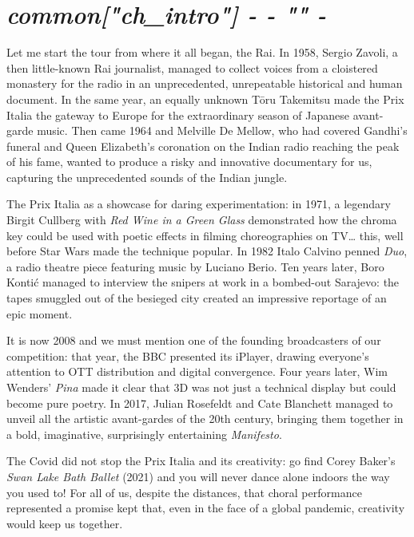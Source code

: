 {%
{%
\chapter*{\hfill{\slshape {{ common["ch_intro"] -}} {{- "}}" -}}
\thispagestyle{empty}
\vspace{70pt}
Let me start the tour from where it all began, the Rai. In 1958, Sergio Zavoli, a then little-known Rai journalist, managed to collect voices from a cloistered monastery for the radio in an unprecedented, unrepeatable historical and human document. In the same year, an equally unknown Tōru Takemitsu made the Prix Italia the gateway to Europe for the extraordinary season of Japanese avant-garde music. Then came 1964 and Melville De Mellow, who had covered Gandhi's funeral and Queen Elizabeth's coronation on the Indian radio reaching the peak of his fame, wanted to produce a risky and innovative documentary for us, capturing the unprecedented sounds of the Indian jungle.

The Prix Italia as a showcase for daring experimentation: in 1971, a legendary Birgit Cullberg with \textit{Red Wine in a Green Glass} demonstrated how the chroma key could be used with poetic effects in filming choreographies on TV\dots{} this, well before Star Wars made the technique popular. In 1982 Italo Calvino penned \textit{Duo}, a radio theatre piece featuring music by Luciano Berio. Ten years later, Boro Kontić managed to interview the snipers at work in a bombed-out Sarajevo: the tapes smuggled out of the besieged city created an impressive reportage of an epic moment.

It is now 2008 and we must mention one of the founding broadcasters of our competition: that year, the BBC presented its iPlayer, drawing everyone's attention to OTT distribution and digital convergence. Four years later, Wim Wenders' \textit{Pina} made it clear that 3D was not just a technical display but could become pure poetry. In 2017, Julian Rosefeldt and Cate Blanchett managed to unveil all the artistic avant-gardes of the 20th century, bringing them together in a bold, imaginative, surprisingly entertaining \textit{Manifesto}.

The Covid did not stop the Prix Italia and its creativity: go find Corey Baker's \textit{Swan Lake Bath Ballet} (2021) and you will never dance alone indoors the way you used to! For all of us, despite the distances, that choral performance represented a promise kept that, even in the face of a global pandemic, creativity would keep us together.

}}
